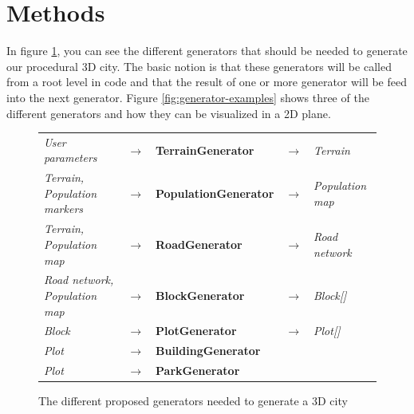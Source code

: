 \section{Methods}
In figure \ref{fig:generators}, you can see the different generators that should be needed to generate our procedural 3D city. 
The basic notion is that these generators will be called from a root level in code and that the result of one or more generator will be feed into the next generator.
Figure \ref{fig:generator-examples} shows three of the different generators and how they can be visualized in a 2D plane. 

\begin{center}
  \begin{figure}[H]
    \begin{center}
      \begin{table}[H]
        \begin{tabular}{lllll}
          \textit{User parameters}              & $\rightarrow$ & \textbf{TerrainGenerator}    & $\rightarrow$ & \textit{Terrain}        \\
          \textit{Terrain, Population markers}  & $\rightarrow$ & \textbf{PopulationGenerator} & $\rightarrow$ & \textit{Population map} \\
          \textit{Terrain, Population map}      & $\rightarrow$ & \textbf{RoadGenerator}       & $\rightarrow$ & \textit{Road network}   \\
          \textit{Road network, Population map} & $\rightarrow$ & \textbf{BlockGenerator}      & $\rightarrow$ & \textit{Block{[}{]}}    \\
          \textit{Block}                        & $\rightarrow$ & \textbf{PlotGenerator}       & $\rightarrow$ & \textit{Plot{[}{]}}     \\
          \textit{Plot}                         & $\rightarrow$ & \textbf{BuildingGenerator}   &               &                         \\
          \textit{Plot}                         & $\rightarrow$ & \textbf{ParkGenerator}       &               &                        
        \end{tabular}
      \end{table}
    \end{center}
    \caption[]{The different proposed generators needed to generate a 3D city}
    \label{fig:generators}
  \end{figure}
\end{center}

